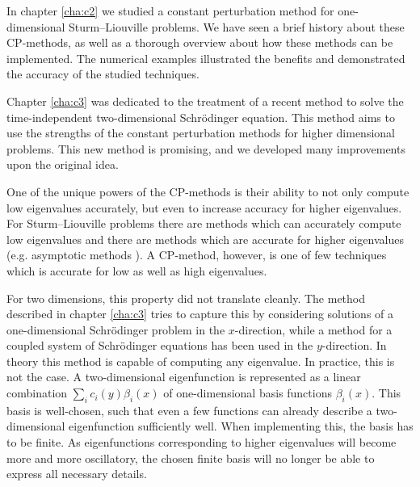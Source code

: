 

\label{cha:c4}

In chapter \ref{cha:c2} we studied a constant perturbation method for one-dimensional Sturm--Liouville problems. We have seen a brief history about these CP-methods, as well as a thorough overview about how these methods can be implemented. The numerical examples illustrated the benefits and demonstrated the accuracy of the studied techniques.

Chapter \ref{cha:c3} was dedicated to the treatment of a recent method to solve the time-independent two-dimensional Schrödinger equation. This method aims to use the strengths of the constant perturbation methods for higher dimensional problems. This new method is promising, and we developed many improvements upon the original idea.

One of the unique powers of the CP-methods is their ability to not only compute low eigenvalues accurately, but even to increase accuracy for higher eigenvalues. For Sturm--Liouville problems there are methods which can accurately compute low eigenvalues and there are methods which are accurate for higher eigenvalues (e.g. asymptotic methods \cite{kuzmina_asymptotic_2000,zhukova_asymptotic_2020}). A CP-method, however, is one of few techniques which is accurate for low as well as high eigenvalues.

For two dimensions, this property did not translate cleanly. The method described in chapter \ref{cha:c3} tries to capture this by considering solutions of a one-dimensional Schrödinger problem in the $x$-direction, while a method for a coupled system of Schrödinger equations has been used in the $y$-direction. In theory this method is capable of computing any eigenvalue. In practice, this is not the case. A two-dimensional eigenfunction is represented as a linear combination $\sum_{i} c_i(y) \beta_i(x)$ of one-dimensional basis functions $\beta_i(x)$. This basis is well-chosen, such that even a few functions can already describe a two-dimensional eigenfunction sufficiently well. When implementing this, the basis has to be finite. As eigenfunctions corresponding to higher eigenvalues will become more and more oscillatory, the chosen finite basis will no longer be able to express all necessary details.

